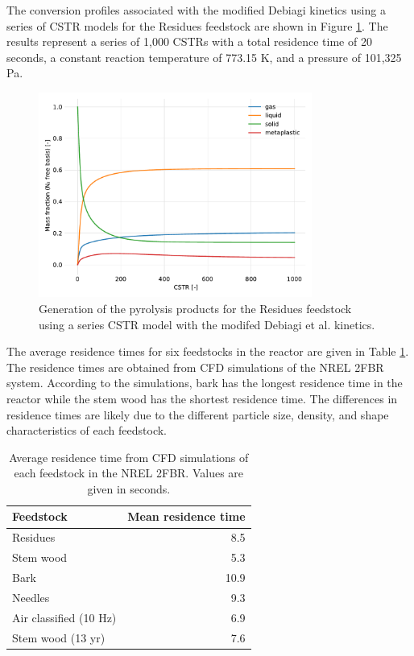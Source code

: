 The conversion profiles associated with the modified Debiagi kinetics using a series of CSTR models for the Residues feedstock are shown in Figure \ref{fig:cstr-products}. The results represent a series of 1,000 CSTRs with a total residence time of 20 seconds, a constant reaction temperature of 773.15 K, and a pressure of 101,325 Pa.

\begin{figure}[H]
    \centering
    \includegraphics[width=0.8\textwidth]{figures/cstr-products.pdf}
    \caption{Generation of the pyrolysis products for the Residues feedstock using a series CSTR model with the modifed Debiagi et al. kinetics.}
    \label{fig:cstr-products}
\end{figure}

The average residence times for six feedstocks in the reactor are given in Table \ref{tab:residence}. The residence times are obtained from CFD simulations of the NREL 2FBR system. According to the simulations, bark has the longest residence time in the reactor while the stem wood has the shortest residence time. The differences in residence times are likely due to the different particle size, density, and shape characteristics of each feedstock.

\begin{table}[H]
    \caption{Average residence time from CFD simulations of each feedstock in the NREL 2FBR. Values are given in seconds.}
    \label{tab:residence}
    \centering
    \begin{tabular}{lr}
        \toprule
        Feedstock & Mean residence time \\
        \midrule
        Residues               & 8.5 \\
        Stem wood              & 5.3 \\
        Bark                   & 10.9 \\
        Needles                & 9.3 \\
        Air classified (10 Hz) & 6.9 \\
        Stem wood (13 yr)      & 7.6 \\
        \bottomrule
    \end{tabular}
\end{table}

